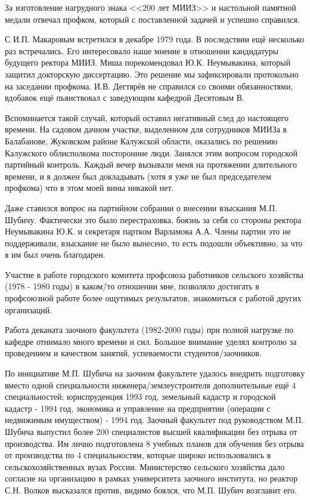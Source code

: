 За изготовление нагрудного знака <<200 лет МИИЗ>> и настольной памятной медали отвечал профком, который с поставленной задачей и успешно справился.

С И.П. Макаровым встретился в декабре 1979 года. В последствии ещё несколько раз встречались. Его интересовало наше мнение в отношении кандидатуры будущего ректора МИИЗ. Миша порекомендовал Ю.К. Неумывакина, который защитил докторскую диссертацию. Это решение мы зафиксировали протокольно на заседании профкома. И.В. Дегтярёв не справился со своими обязанностями, вдобавок ещё пьянствовал с заведующим кафедрой Десятовым В.

Вспоминается такой случай, который оставил негативный след до настоящего времени. На садовом дачном участке, выделенном для сотрудников МИИЗа в Балабанове, Жуковском районе Калужской области, оказались по решению Калужского облисполкома посторонние люди. Занялся этим вопросом городской партийный контроль. Каждый вечер вызывали меня на протяжении длительного времени, и я должен был докладывать (хотя я уже не был председателем профкома) что в этом моей вины никакой нет.

Даже ставился вопрос на партийном собрании о внесении взыскания М.П. Шубичу. Фактически это было перестраховка, боязнь за себя со стороны ректора Неумывакина Ю.К. и секретаря партком Варламова А.А. Члены партии это не поддерживали, взыскание не было вынесено, то есть подошли объективно, за что я им был очень благодарен.

Участие в работе городского комитета профсоюза работников сельского хозяйства (1978 - 1980 годы) в каком\=/то отношении мне, позволяло достигать в профсоюзной работе более ощутимых результатов, знакомиться с работой других организаций.

Работа деканата заочного факультета (1982-2000 годы) при полной нагрузке по кафедре отнимало много времени и сил. Большое внимание уделял контролю за проведением и качеством занятий, успеваемости студентов\-/заочников.

По инициативе М.П. Шубича на заочном факультете удалось внедрить подготовку вместо одной специальности инженера\-/землеустроителя дополнительные ещё 4 специальностей: юриспруденция 1993 год, земельный кадастр и городской кадастр - 1994 год, экономика и управление на предприятии (операции с недвижимым имуществом) - 1994 год. Заочный факультет под руководством М.П. Шубича выпустил более 200 специалистов высшей квалификации без отрыва от производства. Им лично подготовлена 8 учебных планов для обучения без отрыва от производства по 4 специальностям, которые широко использовались в сельскохозяйственных вузах России. Министерство сельского хозяйства дало согласие на организацию в рамках университета заочного института, но реактор С.Н. Волков высказался против, видимо боялся, что М.П. Шубич возглавит его.

